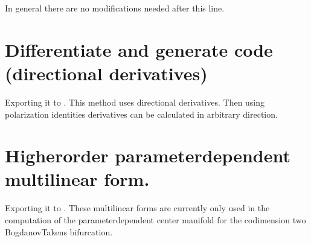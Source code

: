 \documentclass[letterpaper,10pt,english]{jupyterBook}
\begin{document}
\sphinxAtStartPar
In general there are no modifications needed after this line.


\section{Differentiate and generate code (directional derivatives)}
\label{\detokenize{HomoclinicRGflowsGenSym:differentiate-and-generate-code-directional-derivatives}}
\sphinxAtStartPar
Exporting it to . This method uses directional derivatives.
Then using polarization identities derivatives can be calculated in arbitrary
direction.

\begin{sphinxVerbatim}[commandchars=\\\{\}]
\PYG{p}{[}\PYG{p}{]}
\end{sphinxVerbatim}


\section{Higher\sphinxhyphen{}order parameter\sphinxhyphen{}dependent multi\sphinxhyphen{}linear form.}
\label{\detokenize{HomoclinicRGflowsGenSym:higher-order-parameter-dependent-multi-linear-form}}
\sphinxAtStartPar
Exporting it to . These multi\sphinxhyphen{}linear forms are
currently only used in the computation of the parameter\sphinxhyphen{}dependent center
manifold for the codimension two Bogdanov\sphinxhyphen{}Takens bifurcation.

\begin{sphinxVerbatim}[commandchars=\\\{\}]
\PYG{p}{[}\PYG{p}{]}
\end{sphinxVerbatim}
\end{document}
